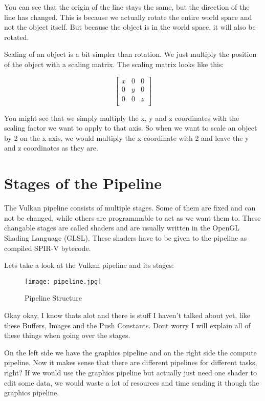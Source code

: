 \documentclass[12pt]{report} \usepackage{preamble}
\begin{document}
You can see that the origin of the line stays the same, but the direction
of the line has changed. This is because we actually rotate the entire
world space and not the object itself. But because the object is in the
world space, it will also be rotated.

Scaling of an object is a bit simpler than rotation. We just multiply
the position of the object with a scaling matrix. The scaling matrix
looks like this:

\[
	\begin{bmatrix}
		x & 0 & 0 \\
		0 & y & 0 \\
		0 & 0 & z \\
	\end{bmatrix}
\]

You might see that we simply multiply the x, y and z coordinates with the
scaling factor we want to apply to that axis. So when we want to scale an
object by 2 on the x axis, we would multiply the x coordinate with 2 and
leave the y and z coordinates as they are.

\section{Stages of the Pipeline}

The Vulkan pipeline consists of multiple stages. Some of them are fixed
and can not be changed, while others are programmable to act as we
want them to. These changable stages are called shaders and are usually
written in the OpenGL Shading Language (GLSL). These shaders have to be
given to the pipeline as compiled SPIR-V bytecode. \cite{spirv}

Lets take a look at the Vulkan pipeline and its stages:

\begin{figure}[hbtp]
	\centering \texttt{[image: pipeline.jpg]} \caption{Pipeline
		Structure \cite{fig:pipeline}}
\end{figure}

Okay okay, I know thats alot and there is stuff I haven't talked about
yet, like these Buffers, Images and the Push Constants.  Dont worry I
will explain all of these things when going over the stages.

On the left side we have the graphics pipeline and on the right side the
compute pipeline. Now it makes sense that there are different pipelines
for different tasks, right? If we would use the graphics pipeline but
actually just need one shader to edit some data, we would waste a lot
of resources and time sending it though the graphics pipeline.
\end{document}

